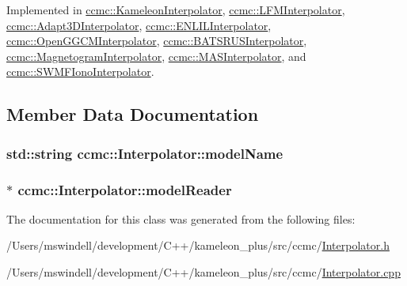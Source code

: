 Implemented in \hyperlink{classccmc_1_1_kameleon_interpolator_a510590ccb55b491c9105a9c5db91cd42}{ccmc\-::\-Kameleon\-Interpolator}, \hyperlink{classccmc_1_1_l_f_m_interpolator_aafa40bcb1aae6e232bc9b883cc8df160}{ccmc\-::\-L\-F\-M\-Interpolator}, \hyperlink{classccmc_1_1_adapt3_d_interpolator_a62f9740d20678b993f2871c6505f7df3}{ccmc\-::\-Adapt3\-D\-Interpolator}, \hyperlink{classccmc_1_1_e_n_l_i_l_interpolator_a92508c6305deec651299b7e70ee3c531}{ccmc\-::\-E\-N\-L\-I\-L\-Interpolator}, \hyperlink{classccmc_1_1_open_g_g_c_m_interpolator_ad7edc3f7862deda978513f923fc30c33}{ccmc\-::\-Open\-G\-G\-C\-M\-Interpolator}, \hyperlink{classccmc_1_1_b_a_t_s_r_u_s_interpolator_a8bb4e9b10064a516192c771462673b09}{ccmc\-::\-B\-A\-T\-S\-R\-U\-S\-Interpolator}, \hyperlink{classccmc_1_1_magnetogram_interpolator_a9a36d83f432f40ab4813428f9b5cd9b3}{ccmc\-::\-Magnetogram\-Interpolator}, \hyperlink{classccmc_1_1_m_a_s_interpolator_ab4015bfd559e1eac116ef1772be91b03}{ccmc\-::\-M\-A\-S\-Interpolator}, and \hyperlink{classccmc_1_1_s_w_m_f_iono_interpolator_a38a298ba550c771204914182d0404eba}{ccmc\-::\-S\-W\-M\-F\-Iono\-Interpolator}.



\subsection{Member Data Documentation}
\hypertarget{classccmc_1_1_interpolator_a7b86407984c4ce59643b926064bdb364}{
\subsubsection[{model\-Name}]{\setlength{\rightskip}{0pt plus 5cm}std\-::string ccmc\-::\-Interpolator\-::model\-Name\hspace{0.3cm}{\ttfamily [protected]}}}\label{classccmc_1_1_interpolator_a7b86407984c4ce59643b926064bdb364}
\hypertarget{classccmc_1_1_interpolator_afee5bb61e5d5a0a7b9152c6f74378c4a}{
\subsubsection[{model\-Reader}]{$\ast$ ccmc\-::\-Interpolator\-::model\-Reader\hspace{0.3cm}{\ttfamily [protected]}}}\label{classccmc_1_1_interpolator_afee5bb61e5d5a0a7b9152c6f74378c4a}


The documentation for this class was generated from the following files\-:\begin{DoxyCompactItemize}
\item 
/\-Users/mswindell/development/\-C++/kameleon\-\_\-plus/src/ccmc/\hyperlink{_interpolator_8h}{Interpolator.\-h}\item 
/\-Users/mswindell/development/\-C++/kameleon\-\_\-plus/src/ccmc/\hyperlink{_interpolator_8cpp}{Interpolator.\-cpp}\end{DoxyCompactItemize}
